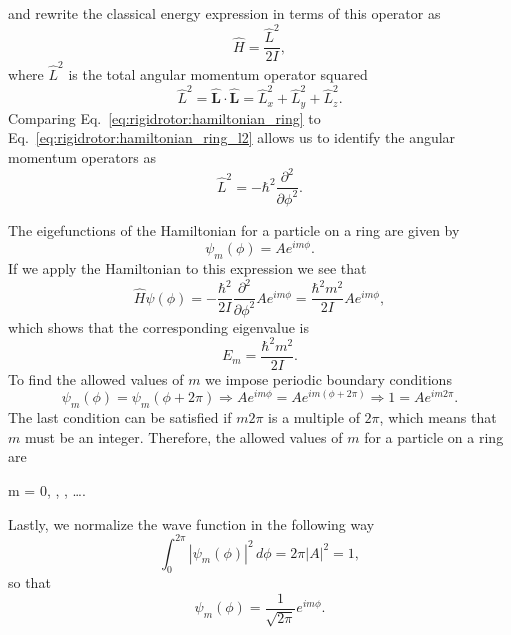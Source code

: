 \documentclass[../Main/chem331-notes.tex]{subfiles}
\begin{document}
and rewrite the classical energy expression in terms of this operator as
\begin{equation}
\label{eq:rigidrotor:hamiltonian_ring_l2}
\hat{H} =\frac{\hat{L}^2}{2 I},
\end{equation}
where $\hat{L}^2$ is the total angular momentum operator squared
\begin{equation}
\hat{L}^2 = \hat{\mathbf{L}} \cdot \hat{\mathbf{L}} = \hat{L}_x^2 + \hat{L}_y^2 + \hat{L}_z^2.
\end{equation}
Comparing Eq.~\eqref{eq:rigidrotor:hamiltonian_ring} to Eq.~\eqref{eq:rigidrotor:hamiltonian_ring_l2} allows us to identify the angular momentum operators as
\begin{equation}
\hat{L}^2 = -\hbar^2 \frac{\partial^2}{\partial \phi^2}.
\end{equation}

The eigefunctions of the Hamiltonian for a particle on a ring are given by
\begin{equation}
\psi_m(\phi) = A e^{i m \phi}.
\end{equation}
If we apply the Hamiltonian to this expression we see that
\begin{equation}
\hat{H} \psi(\phi) = -\frac{\hbar^2}{2 I} \frac{\partial^2}{\partial \phi^2} A e^{i m \phi}
=\frac{\hbar^2 m^2}{2 I}  A e^{i m \phi},
\end{equation}
which shows that the corresponding eigenvalue is 
\begin{equation}
E_m = \frac{\hbar^2 m^2}{2 I}.
\end{equation}
To find the allowed values of $m$ we impose periodic boundary conditions
\begin{equation}
\psi_m(\phi) = \psi_m(\phi + 2\pi) \Rightarrow  A e^{i m \phi} =  A e^{i m (\phi + 2\pi)}  \Rightarrow  1 =  A e^{i m 2\pi}.
\end{equation}
The last condition can be satisfied if $ m 2\pi$ is a multiple of $2\pi$, which means that $m$ must be an integer.
Therefore, the allowed values of $m$ for a particle on a ring are
\begin{iequation}
m = 0, , , \ldots .
\end{iequation}

Lastly, we normalize the wave function in the following way
\begin{equation}
\int_0^{2\pi} |\psi_m(\phi)|^2 \, d\phi = 2 \pi |A|^2 = 1,
\end{equation}
so that
\begin{equation}
\psi_m(\phi) = \frac{1}{\sqrt{2\pi}} e^{i m \phi}.
\end{equation}
\end{document}
